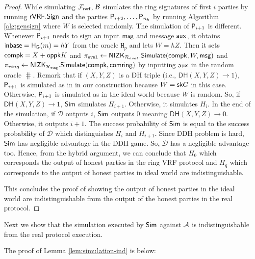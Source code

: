\begin{proof}
	
	While simulating $ \mathcal{F}_{\textsf{rvrf}} $, $\mathcal{B} $ simulates the ring signatures of first $ i $ parties by running $ {\mathsf{rVRF}}.{\mathsf{Sign}} $ and the parties $ \mathsf{P}_{i+2}, \ldots, \mathsf{P}_{n_h} $ by running Algorithm \ref{alg:gensign} where $ W $ is selected randomly. The simulation of $ \mathsf{P}_{i + 1} $ is different.  Whenever $ \mathsf{P}_{i+1} $ needs to sign an input $ \mathsf{msg}$ and message $ \mathsf{aux} $, it obtains $ {\mathsf{inbase}} = {\mathsf{H}}_{{\mathbb{G}}}(m) = hY $ from the oracle $ \mathtt{H}_p $ and lets $ W = hZ $. Then it sets $ \mathsf{compk} = X + \mathsf{oppk}K $ and  $ \pi_{\mathtt{eval}} \leftarrow {\ensuremath{\mathsf{NIZK}}}_{\mathcal{R}_{eval}}.{\mathsf{Simulate}}(\mathsf{compk},W,\mathsf{msg}) $ and  $ \pi_{ring} \leftarrow {\ensuremath{\mathsf{NIZK}}}_{\mathcal{R}_{\mathtt{ring}}}.{\mathsf{Simulate}}(\mathsf{compk}, \mathsf{comring}) $ by inputting $ \mathsf{aux} $ in the random oracle $ \hash $.  Remark that if $ (X,Y,Z)$ is a DH triple (i.e., $  \mathsf{DH}(X,Y,Z) \rightarrow 1 $), $ \mathsf{P}_{i+1} $ is simulated as in in our construction because $ W = \mathsf{sk} G$ in this case. Otherwise, $ \mathsf{P}_{i+1} $ is simulated as in the ideal world because $ W $ is random. So, if $  \mathsf{DH}(X,Y,Z)  \rightarrow 1$, $\mathsf{Sim} $ simulates $ H_{i+1} $. Otherwise, it simulates $ H_{i} $. In the end of the simulation, if $ \mathcal{D} $ outputs $ i $, $\mathsf{Sim} $ outputs $ 0 $ meaning $  \mathsf{DH}(X,Y,Z) \rightarrow 0$. Otherwise, it outputs $ i + 1 $. The success probability of $\mathsf{Sim} $ is equal to the success probability of $\mathcal{D} $ which distinguishes $ H_i $ and $ H_{i +1} $. Since DDH problem is hard, $\mathsf{Sim} $ has negligible advantage in the DDH game. So, $ \mathcal{D} $ has a negligible advantage too. Hence, from the hybrid argument, we can conclude that $ H_0    $ which corresponds the output of honest parties in  the ring VRF protocol and $ H_q  $ which corresponds to  the output of honest parties in ideal world are indistinguishable.
	
	This concludes the proof of showing the output of honest parties in the ideal world are indistinguishable from the output of the honest parties in the real protocol.
\end{proof}	

Next we show that the simulation executed by $ \mathsf{Sim} $ against $ \mathcal{A} $ is indistinguishable from the real protocol execution.

The proof of Lemma \ref{lem:simulation-ind} is below:


